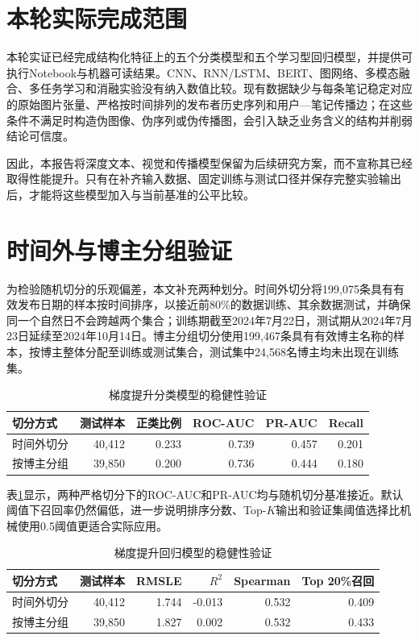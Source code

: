 \section{本轮实际完成范围}
本轮实证已经完成结构化特征上的五个分类模型和五个学习型回归模型，并提供可执行Notebook与机器可读结果。CNN、RNN/LSTM、BERT、图网络、多模态融合、多任务学习和消融实验没有纳入数值比较。现有数据缺少与每条笔记稳定对应的原始图片张量、严格按时间排列的发布者历史序列和用户---笔记传播边；在这些条件不满足时构造伪图像、伪序列或伪传播图，会引入缺乏业务含义的结构并削弱结论可信度。

因此，本报告将深度文本、视觉和传播模型保留为后续研究方案，而不宣称其已经取得性能提升。只有在补齐输入数据、固定训练与测试口径并保存完整实验输出后，才能将这些模型加入与当前基准的公平比较。

\section{时间外与博主分组验证}
为检验随机切分的乐观偏差，本文补充两种划分。时间外切分将199,075条具有有效发布日期的样本按时间排序，以接近前80\%的数据训练、其余数据测试，并确保同一个自然日不会跨越两个集合；训练期截至2024年7月22日，测试期从2024年7月23日延续至2024年10月14日。博主分组切分使用199,467条具有有效博主名称的样本，按博主整体分配至训练或测试集合，测试集中24,568名博主均未出现在训练集。

\begin{table}[htbp]
\centering
\caption{梯度提升分类模型的稳健性验证}
\label{tab:chapter18-classification-robustness}
\begin{tabular}{lrrrrr}
\toprule
切分方式 & 测试样本 & 正类比例 & ROC-AUC & PR-AUC & Recall \\
\midrule
时间外切分 & 40,412 & 0.233 & 0.739 & 0.457 & 0.201 \\
按博主分组 & 39,850 & 0.200 & 0.736 & 0.444 & 0.180 \\
\bottomrule
\end{tabular}
\end{table}

表\ref{tab:chapter18-classification-robustness}显示，两种严格切分下的ROC-AUC和PR-AUC均与随机切分基准接近。默认阈值下召回率仍然偏低，进一步说明排序分数、Top-$K$输出和验证集阈值选择比机械使用0.5阈值更适合实际应用。

\begin{table}[htbp]
\centering
\caption{梯度提升回归模型的稳健性验证}
\label{tab:chapter18-regression-robustness}
\begin{tabular}{lrrrrr}
\toprule
切分方式 & 测试样本 & RMSLE & $R^2$ & Spearman & Top 20\%召回 \\
\midrule
时间外切分 & 40,412 & 1.744 & -0.013 & 0.532 & 0.409 \\
按博主分组 & 39,850 & 1.827 & 0.002 & 0.532 & 0.433 \\
\bottomrule
\end{tabular}
\end{table}

